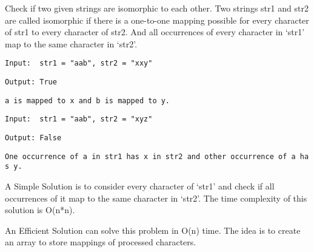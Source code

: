 \documentclass[11pt]{article}
\begin{document}
Check if two given strings are isomorphic to each other. Two strings
str1 and str2 are called isomorphic if there is a one-to-one mapping
possible for every character of str1 to every character of str2. And all
occurrences of every character in `str1' map to the same character in
`str2'.

\texttt{Input:\ \ str1\ =\ "aab",\ str2\ =\ "xxy"}

\texttt{Output:\ True}

\texttt{\textquotesingle{}a\textquotesingle{}\ is\ mapped\ to\ \textquotesingle{}x\textquotesingle{}\ and\ \textquotesingle{}b\textquotesingle{}\ is\ mapped\ to\ \textquotesingle{}y\textquotesingle{}.}

\texttt{Input:\ \ str1\ =\ "aab",\ str2\ =\ "xyz"}

\texttt{Output:\ False}

\texttt{One\ occurrence\ of\ \textquotesingle{}a\textquotesingle{}\ in\ str1\ has\ \textquotesingle{}x\textquotesingle{}\ in\ str2\ and\ other\ occurrence\ of\ \textquotesingle{}a\textquotesingle{}\ has\ \textquotesingle{}y\textquotesingle{}.}

A Simple Solution is to consider every character of `str1' and check if
all occurrences of it map to the same character in `str2'. The time
complexity of this solution is O(n*n).

An Efficient Solution can solve this problem in O(n) time. The idea is
to create an array to store mappings of processed characters.
\end{document}
